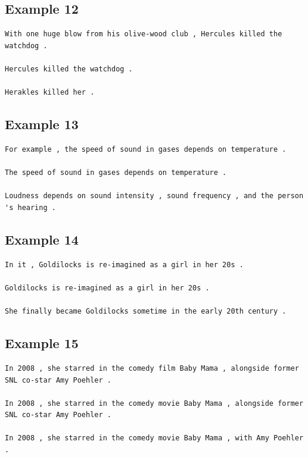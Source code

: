 \documentclass[11pt,twocolumn]{article}
\begin{document}
\subsection*{Example 12}
\label{app:12}
\begin{Verbatim}[fontsize=\scriptsize]
With one huge blow from his olive-wood club , Hercules killed the watchdog .

Hercules killed the watchdog .

Herakles killed her .
\end{Verbatim}

\subsection*{Example 13}
\label{app:13}
\begin{Verbatim}[fontsize=\scriptsize]
For example , the speed of sound in gases depends on temperature .

The speed of sound in gases depends on temperature .

Loudness depends on sound intensity , sound frequency , and the person 's hearing .
\end{Verbatim}

\subsection*{Example 14}
\label{app:14}
\begin{Verbatim}[fontsize=\scriptsize]
In it , Goldilocks is re-imagined as a girl in her 20s .

Goldilocks is re-imagined as a girl in her 20s .

She finally became Goldilocks sometime in the early 20th century .
\end{Verbatim}

\subsection*{Example 15}
\label{app:15}
\begin{Verbatim}[fontsize=\scriptsize]
In 2008 , she starred in the comedy film Baby Mama , alongside former SNL co-star Amy Poehler .

In 2008 , she starred in the comedy movie Baby Mama , alongside former SNL co-star Amy Poehler .

In 2008 , she starred in the comedy movie Baby Mama , with Amy Poehler .
\end{Verbatim}
\end{document}
